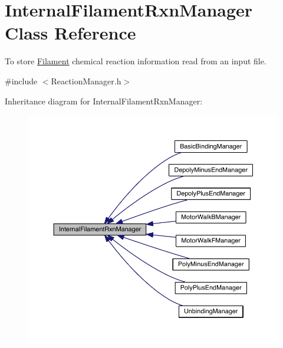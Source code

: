 \hypertarget{classInternalFilamentRxnManager}{\section{Internal\+Filament\+Rxn\+Manager Class Reference}
\label{classInternalFilamentRxnManager}
}


To store \hyperlink{classFilament}{Filament} chemical reaction information read from an input file.  




{\ttfamily \#include $<$Reaction\+Manager.\+h$>$}



Inheritance diagram for Internal\+Filament\+Rxn\+Manager\+:
\nopagebreak
\begin{figure}[H]
\begin{center}
\leavevmode
\includegraphics[width=350pt]{classInternalFilamentRxnManager__inherit__graph}
\end{center}
\end{figure}


